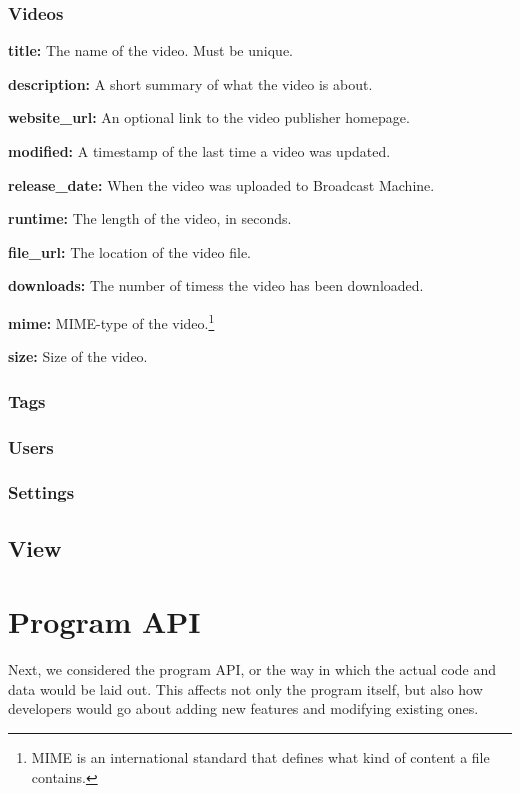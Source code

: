 \documentclass[a4paper,12pt]{report}
\begin{document}
\subsubsection*{Videos}
\begin{description}
\item{\textbf{title: } The name of the video. Must be unique.}
\item{\textbf{description: } A short summary of what the video is about.}
\item{\textbf{website\_url: } An optional link to the video publisher homepage.}
\item{\textbf{modified: } A timestamp of the last time a video was updated.}
\item{\textbf{release\_date: } When the video was uploaded to Broadcast Machine.}
\item{\textbf{runtime: } The length of the video, in seconds.}
\item{\textbf{file\_url: } The location of the video file.}
\item{\textbf{downloads: } The number of timess the video has been downloaded.}
\item{\textbf{mime: } MIME-type of the video.\footnote{MIME is an international standard that defines what kind of content a file contains.}}
\item{\textbf{size: } Size of the video.}
\end{description}

\subsubsection*{Tags}
\subsubsection*{Users}
\subsubsection*{Settings}

\subsection{View}

\section{Program API}
Next, we considered the program API, or the way in which the actual code and data would be laid out.
This affects not only the program itself, but also how developers would go about adding new features and modifying existing ones.
\end{document}
